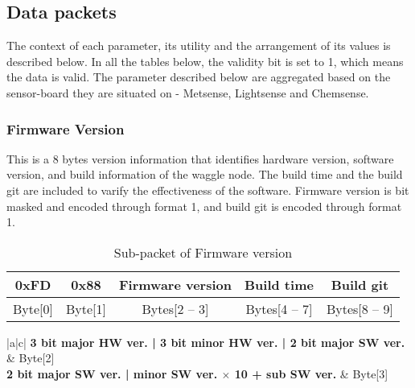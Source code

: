\newpage
\subsection{Data packets}
The context of each parameter, its utility and the arrangement of its values is described below. In all
the tables below, the validity bit is set to 1, which means the data is valid. The parameter described
below are aggregated based on the sensor-board they are situated on -
Metsense, Lightsense and Chemsense.

\subsubsection{Firmware Version}
This is a 8 bytes version information that identifies hardware version, software version, and build information of the waggle node.
The build time and the build git are included to varify the effectiveness of the software.
Firmware version is bit masked and encoded through format 1, and build git is encoded through format 1.

\begin{table}[h!]
    \centering
    \caption{Sub-packet of Firmware version}
    \begin{tabular}{|c|c|c|c|c|}
        \hline
        \rowcolor{black!8}
        \textbf{0xFD} & \textbf{0x88} & \textbf{Firmware version} & \textbf{Build time} & \textbf{Build git} \\ \hline
        Byte[0] & Byte[1] & Bytes[2 -- 3] & Bytes[4 -- 7] & Bytes[8 -- 9]\\ \hline
    \end{tabular}
\end{table}


\begin{table}[h!]
    \centering
    \caption{Firmware version}
    \begin{tabular}{|a|c|}
        \hline
        \textbf{3 bit major HW ver. | 3 bit minor HW ver. | 2 bit major SW ver.} & Byte[2] \\ \hline
        \textbf{2 bit major SW ver. | minor SW ver. $\times$ 10 + sub SW ver.} & Byte[3]\\ \hline
    \end{tabular}
\end{table}
